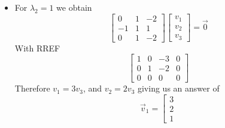 \begin{enumerate}
\begin{itemize}
\[\begin{array}{rrr|r}
                                0 & 1 & -3 & 0\\
                                0 & 0 & 0 & 0
                            \end{array} \right]
                        \]
                        Therefore $v_1 = v_3$, and $v_2 = 3 v_3$ giving us an answer of
                        \[
                            \boxed{
                                \vec{v}_1 =
                                \left[ \begin{array}{r}
                                    1\\ 3\\ 1
                                \end{array} \right]
                                \to \lambda_1 = 2
                            }
                        \]
                    \item For $\lambda_2 = 1$ we obtain
                        \[
                            \left[ \begin{array}{rrr}
                                0 & 1 & -2\\
                                -1 & 1 & 1\\
                                0 & 1 & -2
                            \end{array} \right]
                            \left[ \begin{array}{r}
                                v_1\\ v_2\\ v_3
                            \end{array} \right]
                            = \vec{0}
                        \]
                        With RREF
                        \[
                            \left[ \begin{array}{rrr|r}
                                1 & 0 & -3 & 0\\
                                0 & 1 & -2 & 0\\
                                0 & 0 & 0 & 0
                            \end{array} \right]
                        \]
                        Therefore $v_1 = 3v_3$, and $v_2 = 2 v_3$ giving us an answer of
                        \[
                            \boxed{
                                \vec{v}_1 =
                                \left[ \begin{array}{r}
                                    3\\ 2\\ 1

\end{array}}\]
\end{itemize}
\end{enumerate}
